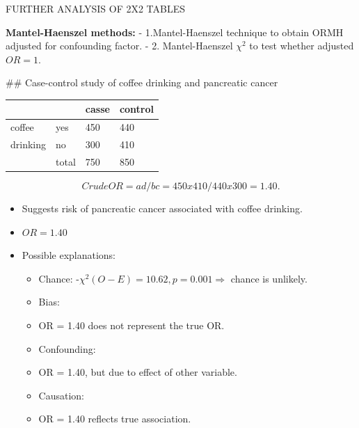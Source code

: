 \documentclass[ignorenonframetext,]{beamer}
\begin{document}
\begin{frame}{FURTHER ANALYSIS OF 2X2 TABLES}

\textbf{Mantel-Haenszel methods:} - 1.Mantel-Haenszel technique to
obtain ORMH adjusted for confounding factor. - 2. Mantel-Haenszel
\(\chi^2\) to test whether adjusted \(OR = 1.\)

\#\# Case-control study of coffee drinking and pancreatic cancer

\begin{longtable}[c]{@{}llll@{}}
\toprule
& & casse & control\tabularnewline
\midrule
\endhead
coffee & yes & 450 & 440\tabularnewline
drinking & no & 300 & 410\tabularnewline
& total & 750 & 850\tabularnewline
\bottomrule
\end{longtable}

\[
Crude OR = ad / bc = 450x410 / 440x300 = 1.40.
\]

\begin{itemize}
\itemsep1pt\parskip0pt
\item
  Suggests risk of pancreatic cancer associated with coffee drinking.
\end{itemize}

\end{frame}

\begin{frame}

\begin{itemize}
\item
  \(OR=1.40\)
\item
  Possible explanations:

  \begin{itemize}
  \itemsep1pt\parskip0pt
  \item
    Chance: -\(\chi^2 (O-E) = 10.62, p=0.001 \Rightarrow\) chance is
    unlikely.
  \item
    Bias:
  \item
    OR = 1.40 does not represent the true OR.
  \item
    Confounding:
  \item
    OR = 1.40, but due to effect of other variable.
  \item
    Causation:
  \item
    OR = 1.40 reflects true association.
  \end{itemize}
\end{itemize}

\end{frame}
\end{document}
